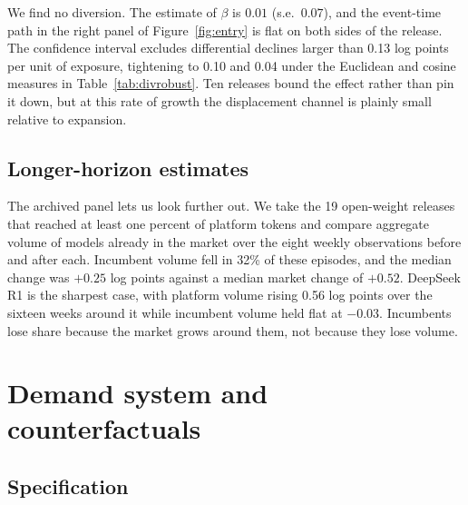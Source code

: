 \documentclass{article}
\newcommand{\DiversionMDE}{0.13}
\newcommand{\NMajor}{19}
\newcommand{\IncGrowthLong}{0.25}
\newcommand{\IncDeclineShare}{32}
\newcommand{\MktGrowthLong}{0.52}
\begin{document}
We find no diversion. The estimate of $\beta$ is $0.01$ (s.e.\ $0.07$), and the event-time
path in the right panel of Figure~\ref{fig:entry} is flat on both sides of the release. The
confidence interval excludes differential declines larger than \DiversionMDE{} log points per
unit of exposure, tightening to 0.10 and 0.04 under the Euclidean and cosine measures in
Table~\ref{tab:divrobust}. Ten releases bound the effect rather than pin it down, but at this
rate of growth the displacement channel is plainly small relative to expansion.

\subsection{Longer-horizon estimates}

The archived panel lets us look further out. We take the \NMajor{} open-weight releases that
reached at least one percent of platform tokens and compare aggregate volume of models already
in the market over the eight weekly observations before and after each. Incumbent volume fell
in \IncDeclineShare\% of these episodes, and the median change was $+\IncGrowthLong{}$ log
points against a median market change of $+\MktGrowthLong{}$. DeepSeek R1
\citep{deepseek2025} is the sharpest case, with platform volume rising 0.56 log points over
the sixteen weeks around it while incumbent volume held flat at $-0.03$. Incumbents lose share
because the market grows around them, not because they lose volume.

\section{Demand system and counterfactuals}

\subsection{Specification}
\end{document}
